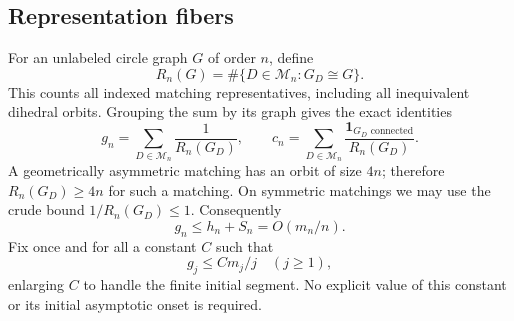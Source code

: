 \documentclass[11pt,letterpaper]{article}
\numberwithin{equation}{section}
\theoremstyle{definition}\newtheorem{definition}[theorem]{Definition}
\theoremstyle{remark}\newtheorem{remark}[theorem]{Remark}
\newcommand{\one}{\mathbf1}
\begin{document}
\subsection{Representation fibers}
For an unlabeled circle graph $G$ of order $n$, define
\[
 R_n(G)=\#\{D\in\mathcal M_n:G_D\cong G\}.
\]
This counts all indexed matching representatives, including all
inequivalent dihedral orbits. Grouping the sum by its graph gives
the exact identities
\begin{equation}\label{cgr:ld:eq:fiber}
 g_n=\sum_{D\in\mathcal M_n}\frac1{R_n(G_D)},\qquad
 c_n=\sum_{D\in\mathcal M_n}
       \frac{\one_{G_D\text{ connected}}}{R_n(G_D)}.
\end{equation}
A geometrically asymmetric matching has an orbit of size $4n$;
therefore $R_n(G_D)\ge4n$ for such a matching. On symmetric
matchings we may use the crude bound $1/R_n(G_D)\le1$.
Consequently
\begin{equation}\label{cgr:ld:eq:coarse-g}
 g_n\le h_n+S_n=O(m_n/n).
\end{equation}
Fix once and for all a constant $C$ such that
\begin{equation}\label{cgr:ld:eq:uniform-g}
 g_j\le C m_j/j\quad(j\ge1),
\end{equation}
enlarging $C$ to handle the finite initial segment. No explicit
value of this constant or its initial asymptotic onset is required.
\end{document}
